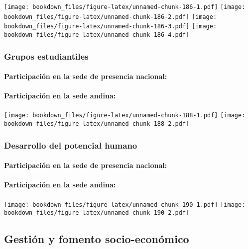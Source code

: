 \documentclass[]{article}
\let\oldparagraph\paragraph
\renewcommand{\paragraph}[1]{\oldparagraph{#1}\mbox{}}
\theoremstyle{definition}
\theoremstyle{definition}
\theoremstyle{definition}
\theoremstyle{remark}
\begin{document}
\texttt{[image: bookdown\_files/figure-latex/unnamed-chunk-186-1.pdf]}
\texttt{[image: bookdown\_files/figure-latex/unnamed-chunk-186-2.pdf]}
\texttt{[image: bookdown\_files/figure-latex/unnamed-chunk-186-3.pdf]}
\texttt{[image: bookdown\_files/figure-latex/unnamed-chunk-186-4.pdf]}

\subsubsection{Grupos estudiantiles}\label{grupos-estudiantiles-1}

\paragraph{Participación en la sede de presencia
nacional:}\label{participacion-en-la-sede-de-presencia-nacional-6}

\paragraph{Participación en la sede
andina:}\label{participacion-en-la-sede-andina-6}

\texttt{[image: bookdown\_files/figure-latex/unnamed-chunk-188-1.pdf]}
\texttt{[image: bookdown\_files/figure-latex/unnamed-chunk-188-2.pdf]}

\subsubsection{Desarrollo del potencial
humano}\label{desarrollo-del-potencial-humano-1}

\paragraph{Participación en la sede de presencia
nacional:}\label{participacion-en-la-sede-de-presencia-nacional-7}

\paragraph{Participación en la sede
andina:}\label{participacion-en-la-sede-andina-7}

\texttt{[image: bookdown\_files/figure-latex/unnamed-chunk-190-1.pdf]}
\texttt{[image: bookdown\_files/figure-latex/unnamed-chunk-190-2.pdf]}

\subsection{Gestión y fomento
socio-económico}\label{gestion-y-fomento-socio-economico-1}
\end{document}
